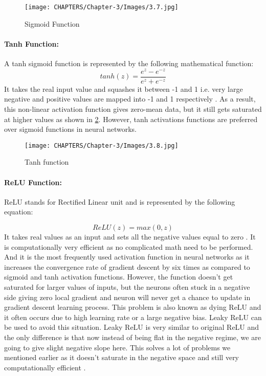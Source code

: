 \begin{figure}[H]
	\centering
		\texttt{[image: CHAPTERS/Chapter-3/Images/3.7.jpg]}
	\caption{Sigmoid Function}
	\label{fig:3.7}
\end{figure}
\paragraph*{Tanh Function:}
A tanh sigmoid function is represented by the following mathematical function:
\begin{equation}
	tanh(z) = \frac{e^{z}-e^{-z}}{e^{z}+e^{-z}}
\end{equation}
It takes the real input value and squashes it between -1 and 1 i.e. very 
large negative and positive values are mapped into -1 and 1 respectively \cite{chap_3_article:5}. As 
a result, this non-linear activation function gives zero-mean data, but it 
still gets saturated at higher values as shown in \ref{fig:3.8}. However, tanh 
activations functions are preferred over sigmoid functions in neural networks.

\begin{figure}[H]
	\centering
		\texttt{[image: CHAPTERS/Chapter-3/Images/3.8.jpg]}
	\caption{Tanh function}
	\label{fig:3.8}
\end{figure}

\paragraph*{ReLU Function:}
ReLU stands for Rectified Linear unit and is represented by the following equation:

\begin{equation}
	ReLU(z) = max(0,z)
\end{equation}
It takes real values as an input and sets all the negative 
values equal to zero \cite{chap_3_article:3}. It is computationally very efficient as no 
complicated math need to be performed. And it is the most frequently used 
activation function in neural networks as it increases the convergence rate 
of gradient descent by six times as compared to sigmoid and tanh activation 
functions. However, the function doesn’t get saturated for larger values of 
inputs, but the neurons often stuck in a negative side giving zero local gradient 
and neuron will never get a chance to update in gradient descent learning process. 
This problem is also known as dying ReLU and it often occurs due to high learning 
rate or a large negative bias. Leaky ReLU can be used to avoid this 
situation. Leaky ReLU is very similar to original ReLU and the only difference 
is that now instead of being flat in the negative regime, we are going to give 
slight negative slope here. This solves a lot of problems we mentioned earlier
as it doesn’t saturate in the negative space and still very computationally efficient \cite{chap_3_article:3}.

